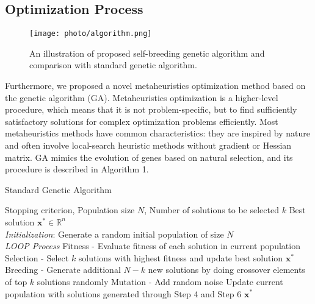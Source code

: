\documentclass[journal]{IEEEtran}
\begin{document}
\subsection{Optimization Process}
\begin{figure}
    \label{fig5}
    \centering
    \texttt{[image: photo/algorithm.png]}
    \caption{An illustration of proposed self-breeding genetic algorithm and comparison with standard genetic algorithm.}
\end{figure}
Furthermore, we proposed a novel metaheuristics optimization method based on the genetic algorithm (GA). Metaheuristics optimization is a higher-level procedure, which means that it is not problem-specific, but to find sufficiently satisfactory solutions for complex optimization problems efficiently. Most metaheuristics methods have common characteristics: they are inspired by nature and often involve local-search heuristic methods without gradient or Hessian matrix. GA mimics the evolution of genes based on natural selection, and its procedure is described in Algorithm 1.
\begin{algorithm}
    \caption{Standard Genetic Algorithm}
    \begin{algorithmic}[1]
        \renewcommand{\algorithmicrequire}{\textbf{Input:}}
        \renewcommand{\algorithmicensure}{\textbf{Output:}}
        \REQUIRE Stopping criterion, Population size $N$, Number of solutions to be selected $k$
        \ENSURE Best solution $\mathbf{x^*} \in \mathbb{R}^n$
        \\ \textit{Initialization}:
        \STATE Generate a random initial population of size $N$
        \\ \textit{LOOP Process}
        \STATE Fitness - Evaluate fitness of each solution in current population
        \STATE Selection - Select $k$ solutions with highest fitness and update best solution $\mathbf{x^{*}}$
        \STATE Breeding - Generate additional $N-k$ new solutions by doing crossover elements of top $k$ solutions randomly
        \STATE Mutation - Add random noise 
        \STATE Update current population with solutions generated through Step 4 and Step 6
        \ENDWHILE
        \RETURN $\mathbf{x^{*}}$ 
    \end{algorithmic} 
\end{algorithm}
\end{document}
